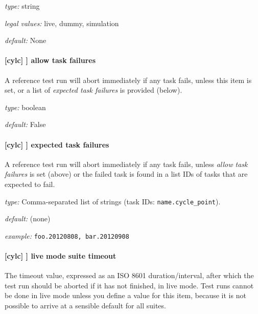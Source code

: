\begin{myitemize}
    \item {\em type:} string
    \item {\em legal values:} live, dummy, simulation
    \item {\em default:} None
\end{myitemize}

\paragraph[allow task failures]{[cylc] \textrightarrow [[reference test]] \textrightarrow allow task failures}

A reference test run will abort immediately if any task fails, unless
this item is set, or a list of {\em expected task failures} is provided
(below).

\begin{myitemize}
    \item {\em type:} boolean
    \item {\em default:} False
\end{myitemize}

\paragraph[expected task failures]{[cylc] \textrightarrow [[reference test]] \textrightarrow expected task failures}

A reference test run will abort immediately if any task fails, unless
{\em allow task failures} is set (above) or the failed task is found
in a list IDs of tasks that are expected to fail.

\begin{myitemize}
    \item {\em type:} Comma-separated list of strings (task IDs: \lstinline=name.cycle_point=).
    \item {\em default:} (none)
    \item {\em example:} \lstinline=foo.20120808, bar.20120908=
\end{myitemize}

\paragraph[live mode suite timeout]{[cylc] \textrightarrow [[reference test]] \textrightarrow live mode suite timeout}

The timeout value, expressed as an ISO 8601 duration/interval, after which the
test run should be aborted if it has not finished, in live mode. Test runs
cannot be done in live mode unless you define a value for this item, because
it is not possible to arrive at a sensible default for all suites.

